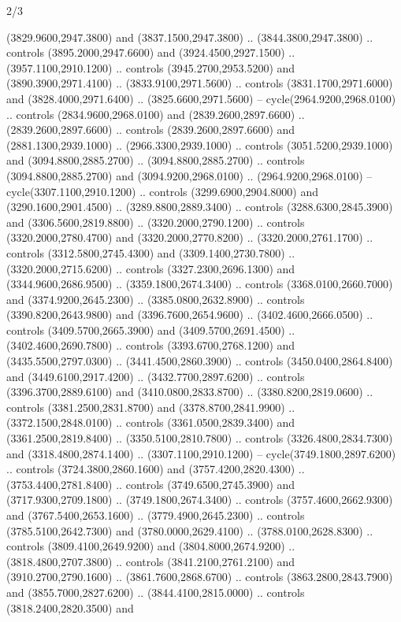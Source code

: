 \begin{flagdescription}{2/3}
\begin{scope}[shift={(0.5\flaglength,0.5)},scale=\flagwidth/130]
\begin{scope}[y=0.01mm, x=0.01mm,shift={(-3365,-2250)}]
  (3829.9600,2947.3800) and (3837.1500,2947.3800) .. (3844.3800,2947.3800) ..
  controls (3895.2000,2947.6600) and (3924.4500,2927.1500) ..
  (3957.1100,2910.1200) .. controls (3945.2700,2953.5200) and
  (3890.3900,2971.4100) .. (3833.9100,2971.5600) .. controls
  (3831.1700,2971.6000) and (3828.4000,2971.6400) .. (3825.6600,2971.5600) --
  cycle(2964.9200,2968.0100) .. controls (2834.9600,2968.0100) and
  (2839.2600,2897.6600) .. (2839.2600,2897.6600) .. controls
  (2839.2600,2897.6600) and (2881.1300,2939.1000) .. (2966.3300,2939.1000) ..
  controls (3051.5200,2939.1000) and (3094.8800,2885.2700) ..
  (3094.8800,2885.2700) .. controls (3094.8800,2885.2700) and
  (3094.9200,2968.0100) .. (2964.9200,2968.0100) -- cycle(3307.1100,2910.1200)
  .. controls (3299.6900,2904.8000) and (3290.1600,2901.4500) ..
  (3289.8800,2889.3400) .. controls (3288.6300,2845.3900) and
  (3306.5600,2819.8800) .. (3320.2000,2790.1200) .. controls
  (3320.2000,2780.4700) and (3320.2000,2770.8200) .. (3320.2000,2761.1700) ..
  controls (3312.5800,2745.4300) and (3309.1400,2730.7800) ..
  (3320.2000,2715.6200) .. controls (3327.2300,2696.1300) and
  (3344.9600,2686.9500) .. (3359.1800,2674.3400) .. controls
  (3368.0100,2660.7000) and (3374.9200,2645.2300) .. (3385.0800,2632.8900) ..
  controls (3390.8200,2643.9800) and (3396.7600,2654.9600) ..
  (3402.4600,2666.0500) .. controls (3409.5700,2665.3900) and
  (3409.5700,2691.4500) .. (3402.4600,2690.7800) .. controls
  (3393.6700,2768.1200) and (3435.5500,2797.0300) .. (3441.4500,2860.3900) ..
  controls (3450.0400,2864.8400) and (3449.6100,2917.4200) ..
  (3432.7700,2897.6200) .. controls (3396.3700,2889.6100) and
  (3410.0800,2833.8700) .. (3380.8200,2819.0600) .. controls
  (3381.2500,2831.8700) and (3378.8700,2841.9900) .. (3372.1500,2848.0100) ..
  controls (3361.0500,2839.3400) and (3361.2500,2819.8400) ..
  (3350.5100,2810.7800) .. controls (3326.4800,2834.7300) and
  (3318.4800,2874.1400) .. (3307.1100,2910.1200) -- cycle(3749.1800,2897.6200)
  .. controls (3724.3800,2860.1600) and (3757.4200,2820.4300) ..
  (3753.4400,2781.8400) .. controls (3749.6500,2745.3900) and
  (3717.9300,2709.1800) .. (3749.1800,2674.3400) .. controls
  (3757.4600,2662.9300) and (3767.5400,2653.1600) .. (3779.4900,2645.2300) ..
  controls (3785.5100,2642.7300) and (3780.0000,2629.4100) ..
  (3788.0100,2628.8300) .. controls (3809.4100,2649.9200) and
  (3804.8000,2674.9200) .. (3818.4800,2707.3800) .. controls
  (3841.2100,2761.2100) and (3910.2700,2790.1600) .. (3861.7600,2868.6700) ..
  controls (3863.2800,2843.7900) and (3855.7000,2827.6200) ..
  (3844.4100,2815.0000) .. controls (3818.2400,2820.3500) and

\end{scope}
\end{scope}
\end{flagdescription}
